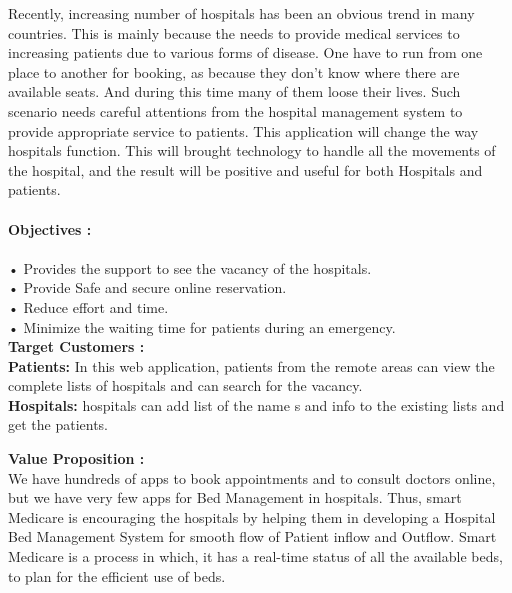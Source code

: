 \documentclass{article}
\begin{document}
\large{Recently, increasing number of hospitals has been an obvious trend in many countries. This is mainly because the needs to provide medical services to increasing patients due to various forms of disease. One have to run from one place to another for booking, as because they don't know where there are available seats. And during this time many of them loose their lives. Such scenario needs careful attentions from the hospital management system to provide appropriate service to patients. This application will change the way hospitals function. This will brought technology to handle all the movements of the hospital, and the result will be positive and useful for both Hospitals and patients.} \\
\vspace{15pt}\\
\Large{\textbf{Objectives : }}
\\
\\\large{•	Provides the support to see the vacancy of the hospitals.\\
•	Provide Safe and secure online reservation.\\
•	Reduce effort and time.\\
•	Minimize the waiting time for patients during an emergency.}\\

\vspace{15pt}
\Large{\textbf{Target Customers : }}\\

{\Large{\textbf{Patients:}}} \large{In this web application, patients from the remote areas can view the complete lists of hospitals and can search for the vacancy.}\\

{\Large{\textbf{Hospitals:}}} \large{hospitals can add list of the name s and info to the existing lists and get the patients.}\\ 

\newpage

\vspace{15pt}
\Large{\textbf{Value Proposition : }}\\

\large{We have hundreds of apps to book appointments and to consult doctors online, but we have very few apps for Bed Management in hospitals. Thus, smart Medicare is encouraging the hospitals by helping them in developing a Hospital Bed Management System for smooth flow of Patient inflow and Outflow. Smart Medicare is a process in which, it has a real-time status of all the available beds, to plan for the efficient use of beds.}\\
\\
\end{document}
